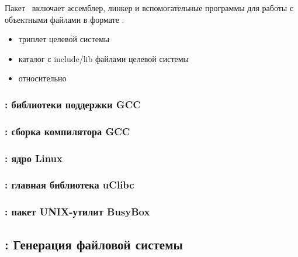 {Пакет \ включает ассемблер, линкер и вспомогательные программы
для работы с объектными файлами в формате . 

\begin{itemize}
  \item{} триплет целевой системы 
  \item{} каталог с include/lib файлами целевой системы
  \item{} относительно 
\end{itemize}



\subsubsection{: библиотеки поддержки GCC}



\subsubsection{: сборка компилятора GCC}




\subsubsection{: ядро Linux}



\subsubsection{: главная библиотека uClibc}



\subsubsection{: пакет UNIX-утилит BusyBox}



\subsection{: Генерация файловой системы}

}
